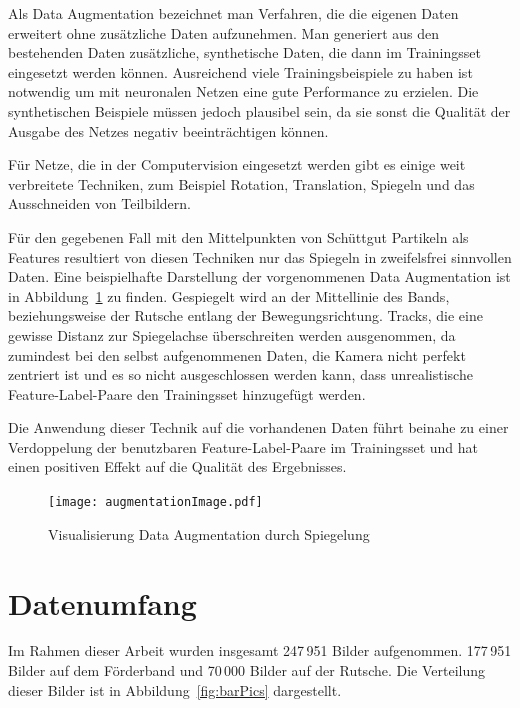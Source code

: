 Als Data Augmentation bezeichnet man Verfahren, die die eigenen Daten erweitert ohne zusätzliche Daten aufzunehmen.
Man generiert aus den bestehenden Daten zusätzliche, synthetische Daten, die dann im Trainingsset eingesetzt werden können.
Ausreichend viele Trainingsbeispiele zu haben ist notwendig um mit neuronalen Netzen eine gute Performance zu erzielen.
Die synthetischen Beispiele müssen jedoch plausibel sein, da sie sonst die Qualität der Ausgabe des Netzes negativ beeinträchtigen können.

Für Netze, die in der Computervision eingesetzt werden gibt es einige weit verbreitete Techniken,
zum Beispiel Rotation, Translation, Spiegeln und das Ausschneiden von Teilbildern.

Für den gegebenen Fall mit den Mittelpunkten von Schüttgut Partikeln als Features resultiert von diesen Techniken nur das Spiegeln in zweifelsfrei sinnvollen Daten.
Eine beispielhafte Darstellung der vorgenommenen Data Augmentation ist in Abbildung~\ref{fig:dataAugm} zu finden.
Gespiegelt wird an der Mittellinie des Bands, beziehungsweise der Rutsche entlang der Bewegungsrichtung.
Tracks, die eine gewisse Distanz zur Spiegelachse überschreiten werden ausgenommen, da zumindest bei den selbst aufgenommenen Daten, 
die Kamera nicht perfekt zentriert ist und es so nicht ausgeschlossen werden kann, 
dass unrealistische Feature-Label-Paare den Trainingsset hinzugefügt werden.

Die Anwendung dieser Technik auf die vorhandenen Daten führt beinahe zu einer Verdoppelung 
der benutzbaren Feature-Label-Paare im Trainingsset und hat einen positiven Effekt auf die Qualität des Ergebnisses.

\begin{figure}[h]
	\centering
	\texttt{[image: augmentationImage.pdf]}
	\caption{Visualisierung Data Augmentation durch Spiegelung}
	\label{fig:dataAugm}
\end{figure}



\section{Datenumfang}

Im Rahmen dieser Arbeit wurden insgesamt 247\,951 Bilder aufgenommen.
177\,951 Bilder auf dem Förderband und 70\,000 Bilder auf der Rutsche.
Die Verteilung dieser Bilder ist in Abbildung~\ref{fig:barPics} dargestellt.


